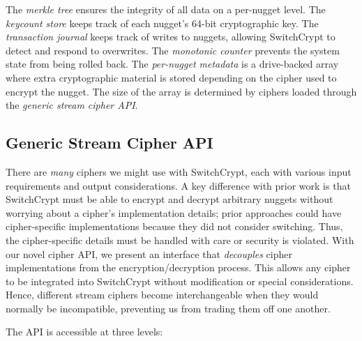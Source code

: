 The \emph{merkle tree} ensures the integrity of all data on a per-nugget level.
The \emph{keycount store} keeps track of each nugget's 64-bit cryptographic key.
The \emph{transaction journal} keeps track of writes to nuggets, allowing
SwitchCrypt to detect and respond to overwrites. The \emph{monotonic counter} 
prevents the system state from being rolled back. The \emph{per-nugget
metadata} is a drive-backed array where extra cryptographic material is stored
depending on the cipher used to encrypt the nugget. The size of the array is
determined by ciphers loaded through the \emph{generic stream cipher API}.

\subsection{Generic Stream Cipher API} \label{subsec:api}

There are \emph{many} ciphers we might use with SwitchCrypt, each with various
input requirements and output considerations. A key difference with prior work 
is that SwitchCrypt
must be able to encrypt and decrypt arbitrary nuggets without worrying about a
cipher's implementation details; prior approaches could have cipher-specific 
implementations because they did not consider switching.   
Thus, the cipher-specific details
must be handled with care or security is violated. With our
novel cipher API, we present an interface that \emph{decouples} cipher
implementations from the encryption/decryption process. This allows any cipher
to be integrated into SwitchCrypt without modification or special
considerations. Hence, different stream ciphers become interchangeable when they
would normally be incompatible, preventing us from trading them off one another.

The API is accessible at three levels:

